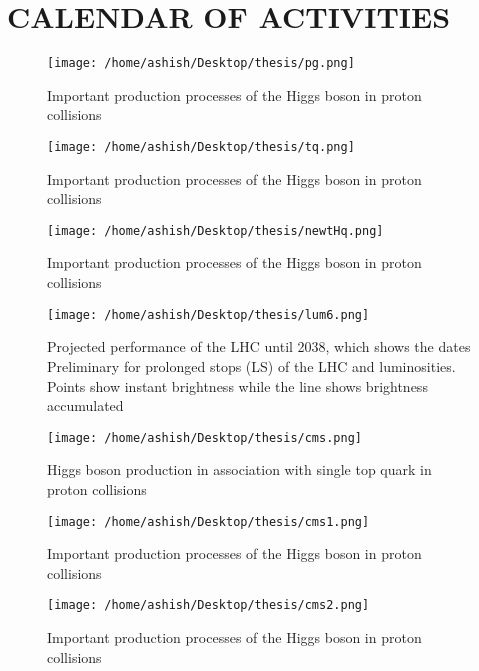 \documentclass[final,3p]{CSP}
\begin{document}
\section{CALENDAR OF ACTIVITIES}

\newpage
\cleanpage



\begin{figure}
  \centering
   \texttt{[image: /home/ashish/Desktop/thesis/pg.png]}
  \caption{Important production processes of the Higgs boson in proton collisions}
   \label{figure 1}
\end{figure}

\begin{figure}
  \centering
   \texttt{[image: /home/ashish/Desktop/thesis/tq.png]}
  \caption{Important production processes of the Higgs boson in proton collisions}
   \label{figure 2}
\end{figure}


\begin{figure}
  \centering
   \texttt{[image: /home/ashish/Desktop/thesis/newtHq.png]}
  \caption{Important production processes of the Higgs boson in proton collisions}
   \label{figure 3}
\end{figure}

\begin{figure}
  \centering
   \texttt{[image: /home/ashish/Desktop/thesis/lum6.png]}
  \caption{\onehalfspacing Projected performance of the LHC until 2038, which shows the dates
Preliminary for prolonged stops (LS) of the LHC and luminosities. Points
show instant brightness while the line shows brightness accumulated}
   \label{figure 4}
\end{figure}

\begin{figure}
  \centering
   \texttt{[image: /home/ashish/Desktop/thesis/cms.png]}
  \caption{Higgs boson production in association with single top quark in proton collisions}
   \label{figure 5}
\end{figure}

\begin{figure}
  \centering
   \texttt{[image: /home/ashish/Desktop/thesis/cms1.png]}
  \caption{Important production processes of the Higgs boson in proton collisions}
   \label{figure 6}
\end{figure}

\begin{figure}
  \centering
   \texttt{[image: /home/ashish/Desktop/thesis/cms2.png]}
  \caption{Important production processes of the Higgs boson in proton collisions}
   \label{figure 7}
\end{figure}
\end{document}

